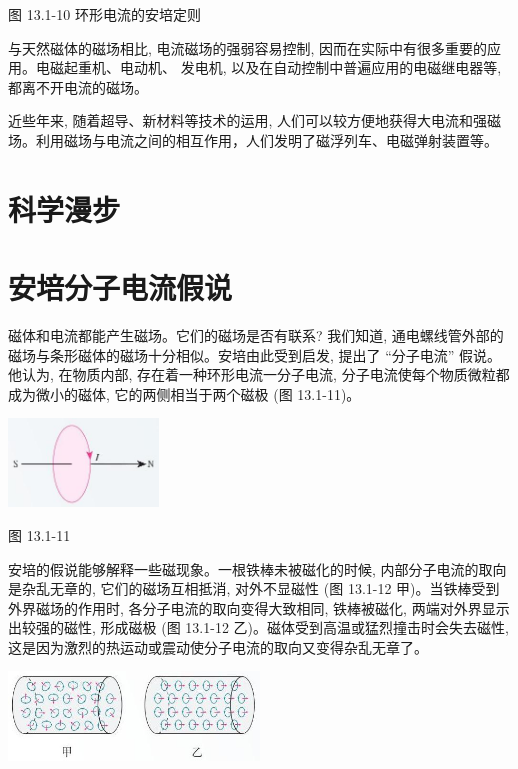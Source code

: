 \documentclass[10pt]{article}
\begin{document}
图 13.1-10 环形电流的安培定则

与天然磁体的磁场相比, 电流磁场的强弱容易控制, 因而在实际中有很多重要的应用。电磁起重机、电动机、 发电机, 以及在自动控制中普遍应用的电磁继电器等, 都离不开电流的磁场。

近些年来, 随着超导、新材料等技术的运用, 人们可以较方便地获得大电流和强磁场。利用磁场与电流之间的相互作用，人们发明了磁浮列车、电磁弹射装置等。

\section*{科学漫步}

\section*{安培分子电流假说}

磁体和电流都能产生磁场。它们的磁场是否有联系? 我们知道, 通电螺线管外部的磁场与条形磁体的磁场十分相似。安培由此受到启发, 提出了 “分子电流” 假说。他认为, 在物质内部, 存在着一种环形电流一分子电流, 分子电流使每个物质微粒都成为微小的磁体, 它的两侧相当于两个磁极 (图 13.1-11)。

\begin{center}
\includegraphics[max width=0.3\textwidth]{images/01911d5f-8e38-70c0-b5b8-2b399bd115b6_112_677702.jpg}
\end{center}

图 13.1-11

安培的假说能够解释一些磁现象。一根铁棒未被磁化的时候, 内部分子电流的取向是杂乱无章的, 它们的磁场互相抵消, 对外不显磁性 (图 13.1-12 甲)。当铁棒受到外界磁场的作用时, 各分子电流的取向变得大致相同, 铁棒被磁化, 两端对外界显示出较强的磁性, 形成磁极 (图 13.1-12 乙)。磁体受到高温或猛烈撞击时会失去磁性, 这是因为激烈的热运动或震动使分子电流的取向又变得杂乱无章了。

\begin{center}
\includegraphics[max width=0.5\textwidth]{images/01911d5f-8e38-70c0-b5b8-2b399bd115b6_113_981083.jpg}
\end{center}
\end{document}
